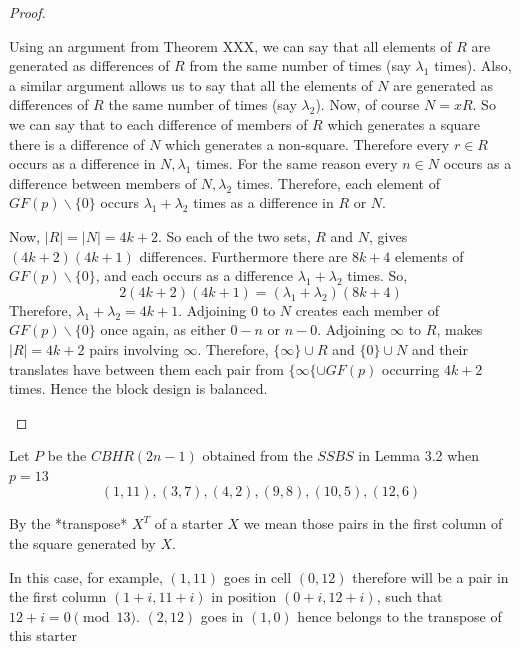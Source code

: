 \documentclass[
  11pt,
  a4paper]{book}\usepackage[]{graphicx}\usepackage[]{xcolor}
\newcounter{example}
\begin{document}
\begin{proof}
\begin{enumerate}
{    Using an argument from Theorem XXX, we can say that
    all elements of $R$ are generated as differences of $R$
    from the same number of times (say $\lambda _1$ times).
    Also, a similar argument allows us to say that all the
    elements of $N$ are generated as differences of $R$ the
    same number of times (say $\lambda _2$). Now, of course
    $N = xR$. So we can say that to each difference of
    members of $R$ which generates a square there is a
    difference of $N$ which generates a non-square.
    Therefore every $r \in R$ occurs as a difference in
    $N, \lambda _1$ times. For the same reason every
    $n \in N$ occurs as a difference between members of
    $N, \lambda _2$ times. Therefore, each element of
    $GF(p) \backslash \{0\}$ occurs $\lambda _1 + \lambda _2$
    times as a difference in $R$ or $N$.
    
    Now, $|R| = |N| = 4k + 2$. So each of the two sets, $R$
    and $N$, gives $(4k + 2)(4k + 1)$ differences. Furthermore
    there are $8k + 4$ elements of $GF(p) \backslash \{0\}$,
    and each occurs as a difference
    $\lambda _1 + \lambda _2$ times. So,
    \begin{equation}
    2(4k + 2)(4k + 1) = (\lambda _1 + \lambda _2)(8k + 4)
    \end{equation}
    Therefore, $\lambda _1 + \lambda _2 = 4k + 1$.
    Adjoining 0 to $N$ creates each member of
    $GF(p) \backslash \{0\}$ once again, as either $0-n$ or
    $n-0$.
    Adjoining $\infty$ to $R$, makes $|R| = 4k + 2$ pairs
    involving $\infty$. Therefore, $\{\infty\} \cup R$ and
    $\{0\} \cup N$ and their translates have between them
    each pair from $\{\infty\{ \cup GF(p)$ occurring $4k + 2$
    times. Hence the block design is balanced.}
\end{enumerate}
\end{proof}

\begin{example}
Let $P$ be the $CBHR(2n - 1)$ obtained from the $SSBS$ in
Lemma 3.2 when $p = 13$
\begin{equation}
  (1, 11), (3, 7), (4, 2), (9, 8), (10, 5), (12, 6)
\end{equation}
\end{example}

By the *transpose* $X^T$ of a starter $X$ we mean those
pairs in the first column of the square generated by $X$.

In this case, for example, $(1, 11)$ goes in cell $(0, 12)$
therefore will be a pair in the first column
$(1 + i, 11 + i)$ in position $(0 + i, 12 + i)$, such that
$12 + i = 0\pmod{13}$. $(2, 12)$ goes in $(1, 0)$ hence
belongs to the transpose of this starter
\end{document}
